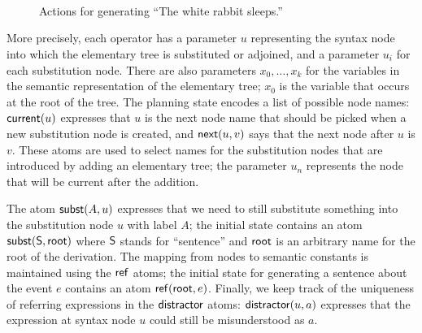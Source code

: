 \begin{figure}
{\small%
\\

\\

}\strut\\[-5ex]
\vspace{-0.2cm}
\caption{Actions for generating ``The white rabbit
sleeps.''}
\label{fig:white-rabbit-as-planning}
\vspace{-0.6cm}
\end{figure}

More precisely, each operator has a parameter $u$ representing the
syntax node into which the elementary tree is substituted or adjoined,
and a parameter $u_i$ for each substitution node.  There are also
parameters $x_0,\ldots,x_k$ for the variables in the semantic
representation of the elementary tree; $x_0$ is the variable that
occurs at the root of the tree.  The planning state encodes a list of
possible node names: $\mathsf{current}(u)$ expresses that $u$ is the next
node name that should be picked when a new substitution node is
created, and $\mathsf{next}(u,v)$ says that the next node after $u$ is
$v$. These atoms are used to select names for the substitution nodes
that are introduced by adding an elementary tree; the parameter $u_n$
represents the node that will be current after the addition.

The atom $\mathsf{subst}(A,u)$ expresses that we need to still substitute
something into the substitution node $u$ with label $A$; the initial
state contains an atom $\mathsf{subst}(\mathsf{S},\mathsf{root})$ where $\mathsf{S}$
stands for ``sentence'' and $\mathsf{root}$ is an arbitrary name for the
root of the derivation.  The mapping from nodes to semantic constants
is maintained using the $\mathsf{ref}$ atoms; the initial state for
generating a sentence about the event $e$ contains an atom
$\mathsf{ref}(\mathsf{root},e)$.  Finally, we keep track of the uniqueness of
referring expressions in the $\mathsf{distractor}$ atoms:
$\mathsf{distractor}(u,a)$ expresses that the expression at syntax node $u$
could still be misunderstood as $a$.

